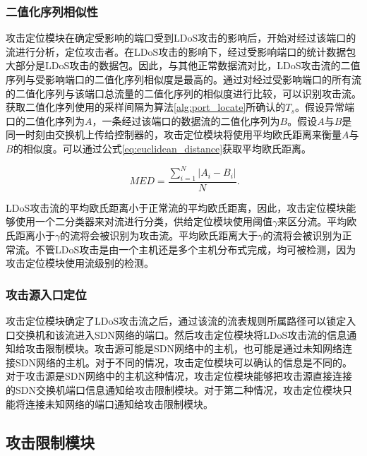\subsubsection{二值化序列相似性}
\label{chap4:seq-similarity}

攻击定位模块在确定受影响的端口受到LDoS攻击的影响后，开始对经过该端口的流进行分析，定位攻击者。在LDoS攻击的影响下，经过受影响端口的统计数据包大部分是LDoS攻击的数据包。因此，与其他正常数据流对比，LDoS攻击流的二值序列与受影响端口的二值化序列相似度是最高的。通过对经过受影响端口的所有流的二值化序列与该端口总流量的二值化序列的相似度进行比较，可以识别攻击流。获取二值化序列使用的采样间隔为算法\ref{alg:port_locate}所确认的$T_s$。假设异常端口的二值化序列为$A$，一条经过该端口的数据流的二值化序列为$B$。假设$A$与$B$是同一时刻由交换机上传给控制器的，攻击定位模块将使用平均欧氏距离来衡量$A$与$B$的相似度。可以通过公式\ref{eq:euclidean_distance}获取平均欧氏距离。

\vspace{-0.15in}
\begin{equation}
	\label{eq:euclidean_distance}
	\ MED=\frac{\sum_{i=1}^{N}\lvert A_{i} - B_{i}\rvert}{N}.
\end{equation}

LDoS攻击流的平均欧氏距离小于正常流的平均欧氏距离，因此，攻击定位模块能够使用一个二分类器来对流进行分类，供给定位模块使用阈值$\gamma$来区分流。平均欧氏距离小于$\gamma$的流将会被识别为攻击流。平均欧氏距离大于$\gamma$的流将会被识别为正常流。不管LDoS攻击是由一个主机还是多个主机分布式完成，均可被检测，因为攻击定位模块使用流级别的检测。


\subsubsection{攻击源入口定位}
\label{chap4:ingressportlocation}

攻击定位模块确定了LDoS攻击流之后，通过该流的流表规则所属路径可以锁定入口交换机和该流进入SDN网络的端口。然后攻击定位模块将LDoS攻击流的信息通知给攻击限制模块。攻击源可能是SDN网络中的主机，也可能是通过未知网络连接SDN网络的主机。对于不同的情况，攻击定位模块可以确认的信息是不同的。对于攻击源是SDN网络中的主机这种情况，攻击定位模块能够把攻击源直接连接的SDN交换机端口信息通知给攻击限制模块。对于第二种情况，攻击定位模块只能将连接未知网络的端口通知给攻击限制模块。

\subsection{攻击限制模块}
\label{chap4:Mitigator}

